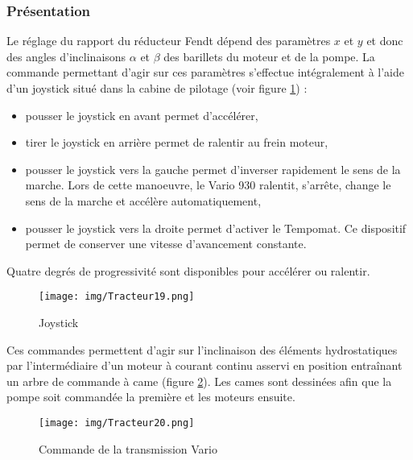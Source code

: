 \subsubsection{Présentation}

Le réglage du rapport du réducteur Fendt dépend des paramètres $x$ et $y$ et donc des angles d'inclinaisons $\alpha$ et $\beta$ des barillets du moteur et de la pompe. La commande permettant d'agir sur ces paramètres s'effectue intégralement à l'aide d'un joystick situé dans la cabine de pilotage (voir figure \ref{fig19}) :
\begin{itemize}
 \item pousser le joystick en avant permet d'accélérer,
 \item tirer le joystick en arrière permet de ralentir au frein moteur,
 \item pousser le joystick vers la gauche permet d'inverser rapidement le sens de la marche. Lors de cette manoeuvre, le Vario 930 ralentit, s'arrête, change le sens de la marche et accélère automatiquement,
 \item pousser le joystick vers la droite permet d'activer le Tempomat. Ce dispositif permet de conserver une vitesse d'avancement constante.
\end{itemize}

Quatre degrés de progressivité sont disponibles pour accélérer ou ralentir.

\begin{figure}[!h]
\centering\texttt{[image: img/Tracteur19.png]}
\caption{Joystick}
\label{fig19}
\end{figure}

Ces commandes permettent d'agir sur l'inclinaison des éléments hydrostatiques par l'intermédiaire d'un moteur à courant continu asservi en position entraînant un arbre de commande à came (figure \ref{fig20}). Les cames sont dessinées afin que la pompe soit commandée la première et les moteurs ensuite.

\begin{figure}[!h]
\centering\texttt{[image: img/Tracteur20.png]}
\caption{Commande de la transmission Vario}
\label{fig20}
\end{figure}

